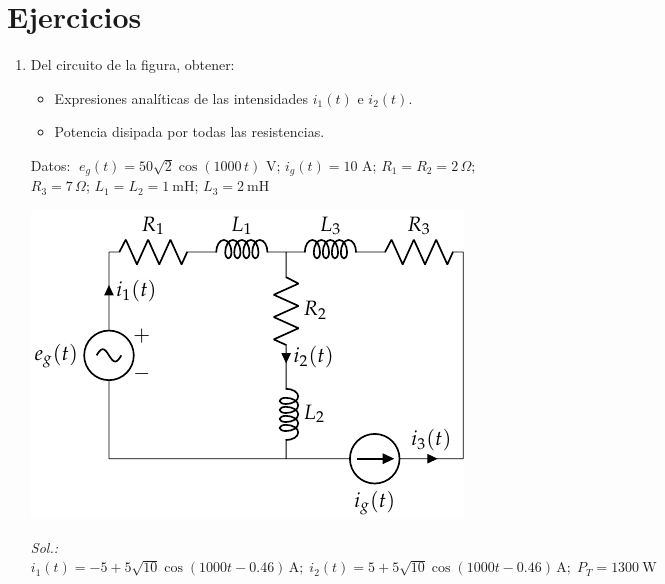\section{Ejercicios}

\begin{enumerate}

  \item Del circuito de la figura, obtener:
  \begin{itemize}
  \item Expresiones analíticas de las intensidades $i_1(t)$ e $i_2(t)$.
  \item Potencia disipada por todas las resistencias.
  \end{itemize}

  Datos: $\; e_g(t)=50\sqrt{2} \cos(1000\,t)$ V; \hspace{2mm}$i_g(t)=10$ A; \hspace{2mm}
$R_1=R_2=2\,\Omega$; \hspace{2mm} $R_3=7\,\Omega$; \hspace{2mm} $L_1=L_2=\qty{1}{\milli\henry}$; \hspace{2mm} $L_3=\qty{2}{\milli\henry}$
  \begin{center}
    \includegraphics{../figs/ej18_BT2.pdf}
  \end{center}
  \emph{Sol.:\; 
    $i_1(t)= -5+5\sqrt{10}\cos(1000t-0.46) \,\si{\ampere};\; i_2(t)=
    5+5\sqrt{10}\cos(1000t-0.46) \,\si{\ampere};\; P_T=\qty{1300}{\watt}$}


\end{enumerate}
